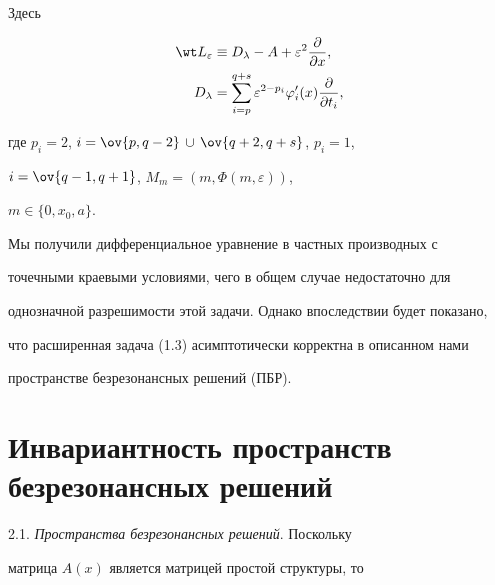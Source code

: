 Здесь 


\begin{equation} 


\begin{split}


\wt L_\varepsilon&\equiv D_\lambda-A+\varepsilon^2 


\frac{\partial}{\partial x}, \\ 


% 


D_\lambda&=\sum^{q+s}_{i=p}\varepsilon^{2-p_i} 


\varphi'_i(x)\frac{\partial}{\partial t_i}, 


\end{split} 


\end{equation}


где $p_i=2$, $i=\ov{p,q-2}\,\cup\,\ov{q+2,q+s}$, $p_i=1$, 


$i=\ov{q-1,q+1}$, $M_m=(m,\Phi(m,\varepsilon))$, 


$m\in\{0,x_0,a\}$. 


 


Мы получили дифференциальное уравнение в частных производных с 


точечными краевыми условиями, чего в общем случае недостаточно для 


однозначной разрешимости этой задачи. Однако впоследствии будет показано, 


что расширенная задача (1.3) асимптотически корректна в описанном нами 


пространстве безрезонансных решений (ПБР). 


 


\section{Инвариантность пространств безрезонансных решений} 


 


2.1. {\it Пространства безрезонансных решений}. Поскольку 


матрица $A(x)$ является матрицей простой структуры, то 


